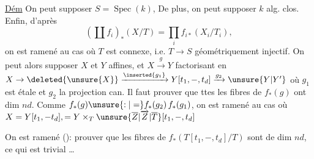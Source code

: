 \uline{Dém} On peut supposer $S=\operatorname{Spec}(k)$, De plus,
on peut supposer $k$ alg. clos. Enfin, d'après
\[
(\coprod f_i)_\ast(X/T)=\prod_i f_{i\ast}(X_i/T_i),
\]
on est ramené au cas où $T$ est connexe, i.e.
$T\to S$ géométriquement injectif. On peut
alors supposer $X$ et $Y$ affines, et $X\xrightarrow{g}Y$
 factorisant en $X\to\deleted{\unsure{X}}\xrightarrow{\inserted{g_1}}Y[t_1,\mathbin{-},t_d]\xrightarrow{g_2}\unsure{Y|Y'}$
 où $g_1$ est étale et $g_2$ la
projection can.  Il faut prouver que
ttes les fibres de $f_\ast(g)$ ont dim $nd$.
Comme $f_\ast(g)\unsure{:|=}f_\ast(g_2)\,f_\ast(g_1)$,  on est ramené
au cas où $X=Y[t_1,\mathbin{-}t_d],=Y\times_T\unsure{\overline Z|\overrightarrow Z|\overline T}[t_1,\mathbin{-},t_d]$
\deleted{\unsure{où|i.e.} $Z=T[t$}

On est ramené (): prouver que les fibres de
$f_\ast(T[t_1,\mathbin{-},t_d]/T)$ sont de dim $nd$,
ce qui est trivial \ldots
